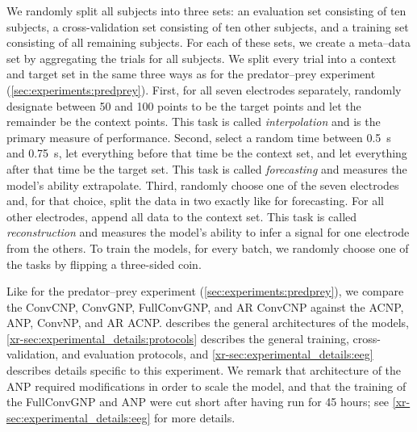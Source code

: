 \documentclass[12pt, twoside]{report}
\newcommand{\xrprefix}[1]{xr-#1}
\begin{document}
We randomly split all subjects into three sets:
an evaluation set consisting of ten subjects,
a cross-validation set consisting of ten other subjects,
and a training set consisting of all remaining subjects.
For each of these sets, we create a meta--data set by aggregating the trials for all subjects.
We split every trial into a context and target set in the same three ways as for the predator--prey experiment (\cref{sec:experiments:predprey}).
First, for all seven electrodes separately, randomly designate between 50 and 100 points to be the target points and let the remainder be the context points.
This task is called \emph{interpolation} and is the primary measure of performance.
Second, select a random time between \SI{0.5}{s} and \SI{0.75}{s}, let everything before that time be the context set, and let everything after that time be the target set.
This task is called \emph{forecasting} and measures the model's ability extrapolate.
Third, randomly choose one of the seven electrodes and, for that choice, split the data in two exactly like for forecasting.
For all other electrodes, append all data to the context set.
This task is called \emph{reconstruction} and measures the model's ability to infer a signal for one electrode from the others.
To train the models, for every batch, we randomly choose one of the tasks by flipping a three-sided coin.

Like for the predator--prey experiment (\cref{sec:experiments:predprey}), we compare the ConvCNP, ConvGNP, FullConvGNP, and AR ConvCNP against the ACNP, ANP, ConvNP, and AR ACNP.
\Cref{\xrprefix{sec:experimental_details:models}} describes the general architectures of the models, \cref{\xrprefix{sec:experimental_details:protocols}} describes the general training, cross-validation, and evaluation protocols, and \cref{\xrprefix{sec:experimental_details:eeg}} describes details specific to this experiment.
We remark that architecture of the ANP required modifications in order to scale the model,
and that the training of the FullConvGNP and ANP were cut short after having run for 45 hours;
see \cref{\xrprefix{sec:experimental_details:eeg}} for more details.
\end{document}
